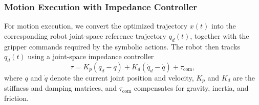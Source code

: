 \documentclass[letterpaper, 10 pt, conference]{ieeeconf}  %
\begin{document}

\subsubsection{Motion Execution with Impedance Controller}
For motion execution, we convert the optimized trajectory $x(t)$ into the corresponding robot joint-space reference trajectory $q_d(t)$, together with the gripper commands required by the symbolic actions. 
The robot then tracks $q_d(t)$ using a joint-space impedance controller~\cite{ott2008passivity}
\begin{equation}
\tau = K_p\left(q_d-q\right) + K_d\left(\dot q_d-\dot q\right) + \tau_{\mathrm{com}},
\end{equation}
where $q$ and $\dot q$ denote the current joint position and velocity, $K_p$ and $K_d$ are the stiffness and damping matrices, and $\tau_{\mathrm{com}}$ compensates for gravity, inertia, and friction. 
\end{document}
